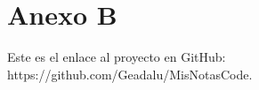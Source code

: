 \chapter{Anexo B}
\label{cap:AnexoB}

Este es el enlace al proyecto en GitHub: https://github.com/Geadalu/MisNotasCode.